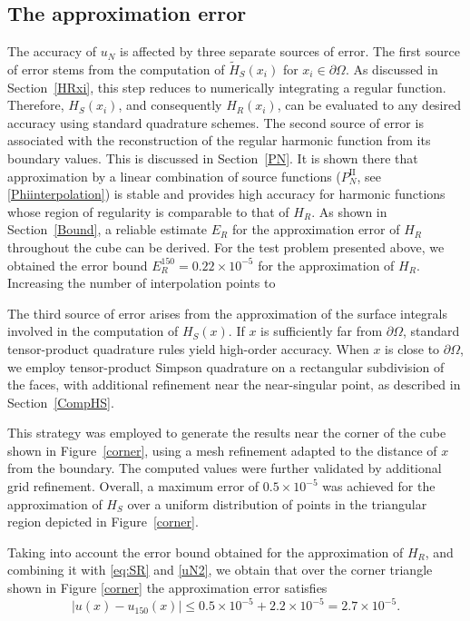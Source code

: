 \documentclass[12pt,oneside,reqno]{amsart}%
\theoremstyle{plain}
\numberwithin{equation}{section}
\begin{document}
\subsection{The approximation error}\hfill

The accuracy of $u_N$ is affected by three separate sources of error. The first source of error stems from the computation of 
$\tilde H_S(x_i)$ for $x_i \in \partial\Omega$. 
As discussed in Section~\ref{HRxi}, this step reduces to numerically integrating a regular function. 
Therefore, $H_S(x_i)$, and consequently $H_R(x_i)$, can be evaluated to any desired accuracy using standard quadrature schemes. The second source of error is associated with the reconstruction 
of the regular harmonic function from its boundary values. 
This is discussed in Section~\ref{PN}. 
It is shown there that approximation by a linear combination 
of source functions ($P_N^{\mathrm{II}}$, see \eqref{Phiinterpolation})
is stable and provides high accuracy for harmonic functions 
whose region of regularity is comparable to that of $H_R$. As shown in Section~\ref{Bound}, a reliable estimate $E_R$
for the approximation error of $H_R$ throughout the cube can be derived. For the test problem presented above, we obtained the error bound $E^{150}_R=0.22\times 10^{-5}$ for the approximation of $H_R$. Increasing the number of interpolation points to 

The third source of error arises from the approximation 
of the surface integrals involved in the computation of $H_S(x)$. 
If $x$ is sufficiently far from $\partial\Omega$, 
standard tensor-product quadrature rules yield high-order accuracy. 
When $x$ is close to $\partial\Omega$, 
we employ tensor-product Simpson quadrature on a rectangular 
subdivision of the faces, with additional refinement 
near the near-singular point, as described in Section~\ref{CompHS}. 

This strategy was employed to generate the results near the corner 
of the cube shown in Figure~\ref{corner}, 
using a mesh refinement adapted to the distance of $x$ 
from the boundary. 
The computed values were further validated by additional 
grid refinement. 
Overall, a maximum error of $0.5\times 10^{-5}$ 
was achieved for the approximation of $H_S$ over a uniform distribution of points 
in the triangular region depicted in Figure~\ref{corner}.

Taking into account the error bound obtained for the approximation of $H_R$, and combining it with \eqref{eq:SR} and \eqref{uN2}, we obtain that over the corner triangle shown in Figure \ref{corner} the approximation error satisfies
\begin{equation}
    |u(x)-u_{150}(x)| \le 0.5\times 10^{-5} + 2.2\times 10^{-5}
    = 2.7\times 10^{-5}.
\end{equation}
\end{document}

